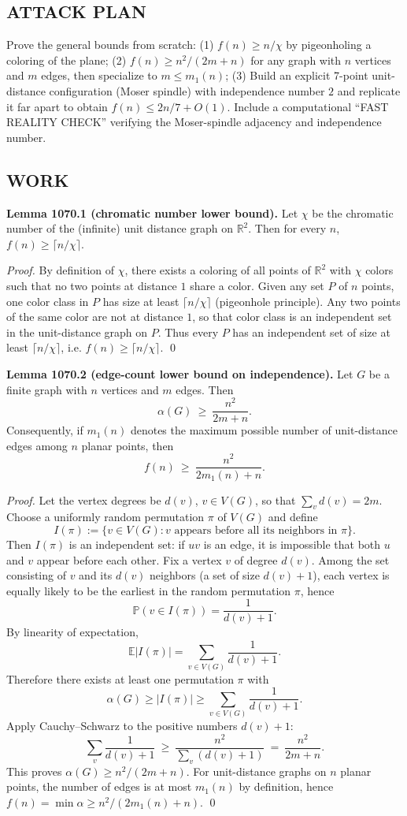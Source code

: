 \subsection*{ATTACK PLAN}
Prove the general bounds from scratch:
(1) $f(n)\ge n/\chi$ by pigeonholing a coloring of the plane;
(2) $f(n)\ge n^2/(2m+n)$ for any graph with $n$ vertices and $m$ edges, then specialize to $m\le m_1(n)$;
(3) Build an explicit 7-point unit-distance configuration (Moser spindle) with independence number $2$ and replicate it far apart to obtain $f(n)\le 2n/7+O(1)$.
Include a computational ``FAST REALITY CHECK'' verifying the Moser-spindle adjacency and independence number.

\subsection*{WORK}
\textbf{Lemma 1070.1 (chromatic number lower bound).}
Let $\chi$ be the chromatic number of the (infinite) unit distance graph on $\mathbb{R}^2$.
Then for every $n$, $f(n)\ge \lceil n/\chi\rceil$.

\emph{Proof.}
By definition of $\chi$, there exists a coloring of all points of $\mathbb{R}^2$ with $\chi$ colors such that no two points at distance $1$ share a color.
Given any set $P$ of $n$ points, one color class in $P$ has size at least $\lceil n/\chi\rceil$ (pigeonhole principle). Any two points of the same color are not at distance $1$, so that color class is an independent set in the unit-distance graph on $P$.
Thus every $P$ has an independent set of size at least $\lceil n/\chi\rceil$, i.e. $f(n)\ge \lceil n/\chi\rceil$.
\qed

\textbf{Lemma 1070.2 (edge-count lower bound on independence).}
Let $G$ be a finite graph with $n$ vertices and $m$ edges. Then
\[
\alpha(G)\ \ge\ \frac{n^2}{2m+n}.
\]
Consequently, if $m_1(n)$ denotes the maximum possible number of unit-distance edges among $n$ planar points, then
\[
 f(n)\ \ge\ \frac{n^2}{2m_1(n)+n}.
\]

\emph{Proof.}
Let the vertex degrees be $d(v)$, $v\in V(G)$, so that $\sum_{v} d(v)=2m$.
Choose a uniformly random permutation $\pi$ of $V(G)$ and define
\[
I(\pi):=\{v\in V(G): v\text{ appears before all its neighbors in }\pi\}.
\]
Then $I(\pi)$ is an independent set: if $uv$ is an edge, it is impossible that both $u$ and $v$ appear before each other.
Fix a vertex $v$ of degree $d(v)$.  Among the set consisting of $v$ and its $d(v)$ neighbors (a set of size $d(v)+1$), each vertex is equally likely to be the earliest in the random permutation $\pi$, hence
\[
\mathbb{P}(v\in I(\pi))=\frac{1}{d(v)+1}.
\]
By linearity of expectation,
\[
\mathbb{E}|I(\pi)|=\sum_{v\in V(G)} \frac{1}{d(v)+1}.
\]
Therefore there exists at least one permutation $\pi$ with
\[
\alpha(G)\ge |I(\pi)|\ge \sum_{v\in V(G)} \frac{1}{d(v)+1}.
\]
Apply Cauchy--Schwarz to the positive numbers $d(v)+1$:
\[
\sum_{v} \frac{1}{d(v)+1}
\ \ge\ \frac{n^2}{\sum_v (d(v)+1)}
\ =\ \frac{n^2}{2m+n}.
\]
This proves $\alpha(G)\ge n^2/(2m+n)$.
For unit-distance graphs on $n$ planar points, the number of edges is at most $m_1(n)$ by definition, hence $f(n)=\min \alpha\ge n^2/(2m_1(n)+n)$.
\qed


